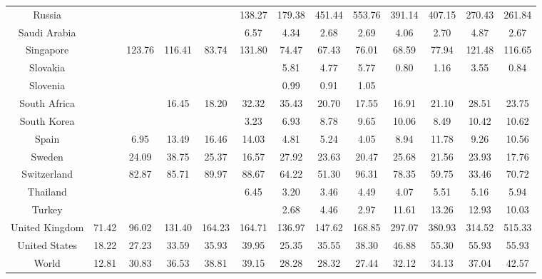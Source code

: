 \documentclass[a4paper, twoside]{templates/ociamthesis}
\begin{document}
\begin{table}
{\begin{tabular}[t]{ccccccccccccc}
Russia &  &  &  &  & 138.27 & 179.38 & 451.44 & 553.76 & 391.14 & 407.15 & 270.43 & 261.84\\
Saudi Arabia &  &  &  &  & 6.57 & 4.34 & 2.68 & 2.69 & 4.06 & 2.70 & 4.87 & 2.67\\
Singapore &  & 123.76 & 116.41 & 83.74 & 131.80 & 74.47 & 67.43 & 76.01 & 68.59 & 77.94 & 121.48 & 116.65\\
Slovakia &  &  &  &  &  & 5.81 & 4.77 & 5.77 & 0.80 & 1.16 & 3.55 & 0.84\\
Slovenia &  &  &  &  &  & 0.99 & 0.91 & 1.05 &  &  &  & \\
South Africa &  &  & 16.45 & 18.20 & 32.32 & 35.43 & 20.70 & 17.55 & 16.91 & 21.10 & 28.51 & 23.75\\
South Korea &  &  &  &  & 3.23 & 6.93 & 8.78 & 9.65 & 10.06 & 8.49 & 10.42 & 10.62\\
Spain &  & 6.95 & 13.49 & 16.46 & 14.03 & 4.81 & 5.24 & 4.05 & 8.94 & 11.78 & 9.26 & 10.56\\
Sweden &  & 24.09 & 38.75 & 25.37 & 16.57 & 27.92 & 23.63 & 20.47 & 25.68 & 21.56 & 23.93 & 17.76\\
Switzerland &  & 82.87 & 85.71 & 89.97 & 88.67 & 64.22 & 51.30 & 96.31 & 78.35 & 59.75 & 33.46 & 70.72\\
Thailand &  &  &  &  & 6.45 & 3.20 & 3.46 & 4.49 & 4.07 & 5.51 & 5.16 & 5.94\\
Turkey &  &  &  &  &  & 2.68 & 4.46 & 2.97 & 11.61 & 13.26 & 12.93 & 10.03\\
United Kingdom & 71.42 & 96.02 & 131.40 & 164.23 & 164.71 & 136.97 & 147.62 & 168.85 & 297.07 & 380.93 & 314.52 & 515.33\\
United States & 18.22 & 27.23 & 33.59 & 35.93 & 39.95 & 25.35 & 35.55 & 38.30 & 46.88 & 55.30 & 55.93 & 55.93\\
World & 12.81 & 30.83 & 36.53 & 38.81 & 39.15 & 28.28 & 28.32 & 27.44 & 32.12 & 34.13 & 37.04 & 42.57\\
\bottomrule
\end{tabular}}
\end{table}

\clearpage
\end{document}
